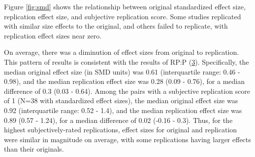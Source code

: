 \documentclass[
  english,
  a4paper,
]{article}
\begin{document}
Figure \ref{fig:smd} shows the relationship between original standardized effect size, replication effect size, and subjective replication score. Some studies replicated with similar size effects to the original, and others failed to replicate, with replication effect sizes near zero.

On average, there was a diminution of effect sizes from original to replication. This pattern of results is consistent with the results of RP:P (\protect\hyperlink{ref-openscienceconsortium2015}{3}). Specifically, the median original effect size (in SMD units) was 0.61 (interquartile range: 0.46 - 0.98), and the median replication effect size was 0.28 (0.09 - 0.76), for a median difference of 0.3 (0.03 - 0.64). Among the pairs with a subjective replication score of 1 (N=38 with standardized effect sizes), the median original effect size was 0.92 (interquartile range: 0.52 - 1.4), and the median replication effect size was 0.89 (0.57 - 1.24), for a median difference of 0.02 (-0.16 - 0.3). Thus, for the highest subjectively-rated replications, effect sizes for original and replication were similar in magnitude on average, with some replications having larger effects than their originals.
\end{document}

